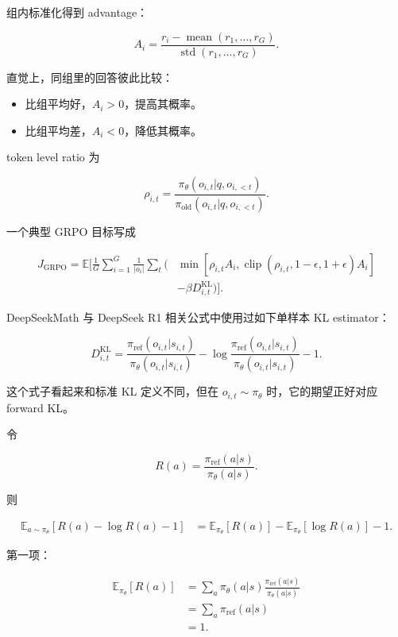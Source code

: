 \documentclass[11pt,a4paper]{ctexart}
\newcommand{\E}{\mathbb{E}}
\newcommand{\piold}{\pi_{\mathrm{old}}}
\newcommand{\piref}{\pi_{\mathrm{ref}}}
\newcommand{\pitheta}{\pi_{\theta}}
\begin{document}
组内标准化得到 advantage：

\begin{equation}
A_i
=
\frac{
r_i-\operatorname{mean}(r_1,\ldots,r_G)
}{
\operatorname{std}(r_1,\ldots,r_G)
}.
\end{equation}

直觉上，同组里的回答彼此比较：

\begin{itemize}
    \item 比组平均好，$A_i>0$，提高其概率。
    \item 比组平均差，$A_i<0$，降低其概率。
\end{itemize}

token level ratio 为

\begin{equation}
\rho_{i,t}
=
\frac{
\pitheta(o_{i,t}|q,o_{i,<t})
}{
\piold(o_{i,t}|q,o_{i,<t})
}.
\end{equation}

一个典型 GRPO 目标写成

\begin{align}
J_{\mathrm{GRPO}}
=
\E
\Bigg[
\frac{1}{G}
\sum_{i=1}^{G}
\frac{1}{|o_i|}
\sum_t
\Big(
&
\min
[
\rho_{i,t}A_i,
\operatorname{clip}(\rho_{i,t},1-\epsilon,1+\epsilon)A_i
]
\nonumber\\
&
-
\beta D_{i,t}^{\mathrm{KL}}
\Big)
\Bigg].
\end{align}

DeepSeekMath 与 DeepSeek R1 相关公式中使用过如下单样本 KL estimator：

\begin{equation}
D_{i,t}^{\mathrm{KL}}
=
\frac{\piref(o_{i,t}|s_{i,t})}
{\pitheta(o_{i,t}|s_{i,t})}
-
\log
\frac{\piref(o_{i,t}|s_{i,t})}
{\pitheta(o_{i,t}|s_{i,t})}
-1.
\label{eq:grpo_kl_estimator}
\end{equation}

这个式子看起来和标准 KL 定义不同，但在 $o_{i,t}\sim\pitheta$ 时，它的期望正好对应 forward KL。

令

\[
R(a)
=
\frac{\piref(a|s)}{\pitheta(a|s)}.
\]

则

\begin{align}
\E_{a\sim\pitheta}
[
R(a)-\log R(a)-1
]
&=
\E_{\pitheta}[R(a)]
-
\E_{\pitheta}[\log R(a)]
-1.
\end{align}

第一项：

\begin{align}
\E_{\pitheta}[R(a)]
&=
\sum_a
\pitheta(a|s)
\frac{\piref(a|s)}{\pitheta(a|s)}
\\
&=
\sum_a\piref(a|s)
\\
&=
1.
\end{align}
\end{document}
